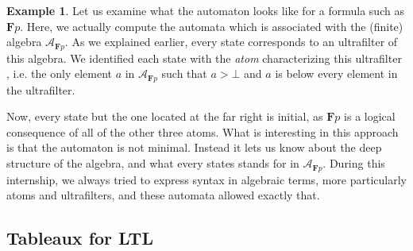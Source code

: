 \documentclass[11pt]{article}
\newcommand{\X}{{\mathbf{X}}}
\newcommand{\F}{{\mathbf{F}}}
\newcommand{\andd}{{\wedge}}
\theoremstyle{definition}
\newtheorem{example}[definition]{Example}
\begin{document}
\begin{example}\label{autom_ltl_ex}
Let us examine what the automaton looks like for a formula such as $\F p$. Here, we actually compute the automata which is associated with
the (finite) algebra $\mathcal{A}_{\F p}$. As we explained earlier, every state corresponds to an ultrafilter of this algebra. 
We identified each state with the \emph{atom} characterizing this ultrafilter \cite[Section 1.2]{GehvG22}, i.e. the only element $a$ in 
$\mathcal{A}_{\F p}$ such that $a>\bot$ and $a$ is below every element in the ultrafilter.
    \begin{center}
\end{center}
Now, every state but the one located at the far right is initial, as $\F p$ is a logical consequence of all of the other three atoms. What is
interesting in this approach is that the automaton is not minimal. Instead it lets us know about the deep structure of the algebra, and what every 
states stands for in $\mathcal{A}_{\F p}$. During this internship, we always tried to express syntax in algebraic terms, more particularly 
atoms and ultrafilters, and these automata allowed exactly that.
\end{example}


\subsection{Tableaux for LTL}\label{subsec:tableauxLTL}
\end{document}
